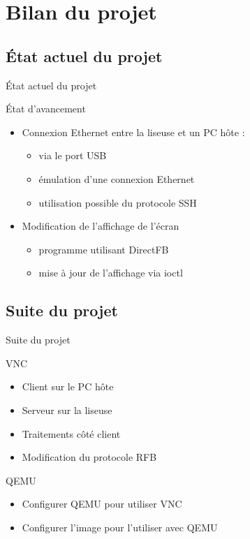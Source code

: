 \section[Bilan]{Bilan du projet}
\subsection[État actuel]{État actuel du projet}
\begin{frame}{État actuel du projet}

\begin{block}{État d'avancement}

	\begin{itemize}
		\item Connexion Ethernet entre la liseuse et un PC hôte :
		\begin{itemize}
			\item via le port USB
			\item émulation d'une connexion Ethernet
			\item utilisation possible du protocole SSH
		\end{itemize}
		\item Modification de l'affichage de l'écran
		\begin{itemize}
			\item programme utilisant DirectFB
			\item mise à jour de l'affichage via ioctl
		\end{itemize}
	\end{itemize}

\end{block}

\end{frame}

\subsection[Suite]{Suite du projet}
\begin{frame}{Suite du projet}

\begin{block}{VNC}
	\begin{itemize}
		\item Client sur le PC hôte
		\item Serveur sur la liseuse
		\item Traitements côté client
		\item Modification du protocole RFB
	\end{itemize}
\end{block}

\begin{block}{QEMU}
	\begin{itemize}
		\item Configurer QEMU pour utiliser VNC
		\item Configurer l'image pour l'utiliser avec QEMU
	\end{itemize}
\end{block}

\end{frame}